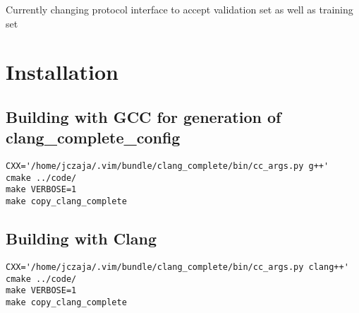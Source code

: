 \documentclass[a4paper,10pt]{article}
\begin{document}
Currently changing protocol interface to accept validation set as well as training set




\section{Installation}
\subsection{Building with GCC for generation of clang\_complete\_config}
\begin{verbatim}
CXX='/home/jczaja/.vim/bundle/clang_complete/bin/cc_args.py g++'   cmake ../code/
make VERBOSE=1
make copy_clang_complete
\end{verbatim}
\subsection{Building with Clang}
\begin{verbatim}
CXX='/home/jczaja/.vim/bundle/clang_complete/bin/cc_args.py clang++'   cmake ../code/
make VERBOSE=1
make copy_clang_complete
\end{verbatim}
\end{document}
